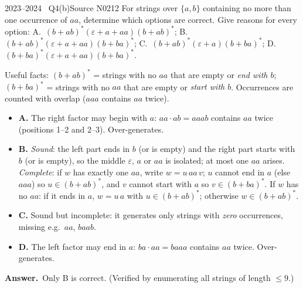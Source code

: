 \documentclass[11pt,a4paper]{article}
\newcommand{\eps}{\varepsilon}
\newcommand{\ok}{\textcolor{teal}{\ensuremath{\checkmark}}}
\newcommand{\no}{\textcolor{coral}{\ensuremath{\times}}}
\newcommand{\ans}[1]{\par\smallskip\noindent\colorbox{mist}{\parbox{\dimexpr\linewidth-2\fboxsep}{\sffamily\small\textbf{\color{teal}Answer.}\ \color{ink}#1}}\par}
\begin{document}
\begin{question}{2023--2024 \textbullet\ Q4(b)}{Source N02}{12}
For strings over $\{a,b\}$ containing no more than one occurrence of $aa$, determine which options are correct. Give reasons for every option:
A.\ $(b+ab)^*(\eps+a+aa)(b+ab)^*$;\quad
B.\ $(b+ab)^*(\eps+a+aa)(b+ba)^*$;\quad
C.\ $(b+ab)^*(\eps+a)(b+ba)^*$;\quad
D.\ $(b+ba)^*(\eps+a+aa)(b+ba)^*$.
\end{question}
\begin{solution}
Useful facts: $(b+ab)^*$ = strings with no $aa$ that are empty or \emph{end with $b$}; $(b+ba)^*$ = strings with no $aa$ that are empty or \emph{start with $b$}. Occurrences are counted with overlap ($aaa$ contains $aa$ twice).
\begin{itemize}
\item[\no] \textbf{A.} The right factor may begin with $a$: $aa\cdot ab=aaab$ contains $aa$ twice (positions 1--2 and 2--3). Over-generates.
\item[\ok] \textbf{B.} \emph{Sound}: the left part ends in $b$ (or is empty) and the right part starts with $b$ (or is empty), so the middle $\eps$, $a$ or $aa$ is isolated; at most one $aa$ arises. \emph{Complete}: if $w$ has exactly one $aa$, write $w=u\,aa\,v$; $u$ cannot end in $a$ (else $aaa$) so $u\in(b+ab)^*$, and $v$ cannot start with $a$ so $v\in(b+ba)^*$. If $w$ has no $aa$: if it ends in $a$, $w=u\,a$ with $u\in(b+ab)^*$; otherwise $w\in(b+ab)^*$.
\item[\no] \textbf{C.} Sound but incomplete: it generates only strings with \emph{zero} occurrences, missing e.g.\ $aa$, $baab$.
\item[\no] \textbf{D.} The left factor may end in $a$: $ba\cdot aa=baaa$ contains $aa$ twice. Over-generates.
\end{itemize}
\ans{Only B is correct. (Verified by enumerating all strings of length $\le 9$.)}
\end{solution}
\end{document}
